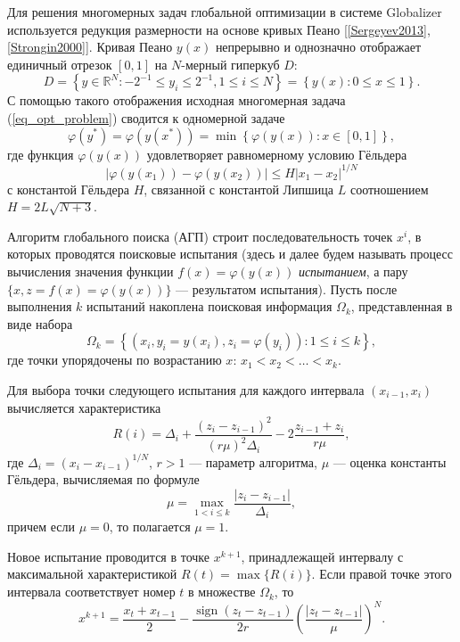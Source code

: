 \documentclass[10pt,a4paper]{book}
\begin{document}
Для решения многомерных задач глобальной оптимизации в системе Globalizer используется редукция размерности на основе кривых Пеано [\ref{Sergeyev2013}, \ref{Strongin2000}]. Кривая Пеано $y(x)$ непрерывно и однозначно отображает единичный отрезок $[0,1]$ на $N$-мерный гиперкуб $D$:
\[
D = \left\{ y \in \mathbb{R}^N: -2^{-1} \leqslant y_i \leqslant 2^{-1}, 1 \leqslant i \leqslant N \right\} = \left\{ y(x): 0 \leqslant x \leqslant 1 \right\}.
\]
С помощью такого отображения исходная многомерная задача (\ref{eq_opt_problem}) сводится к одномерной задаче
\[
\varphi(y^\ast)=\varphi(y(x^\ast))=\min{\left\{\varphi(y(x)): x\in[0,1]\right\}},
\]
где функция $\varphi(y(x))$ удовлетворяет равномерному условию Гёльдера
\[
\left|\varphi(y(x_1))-\varphi(y(x_2))\right|\leqslant H\left|x_1-x_2\right|^{1/N}
\]
с константой Гёльдера $H$, связанной с константой Липшица $L$ соотношением $H = 2L\sqrt{N+3}$.

Алгоритм глобального поиска (АГП) строит последовательность точек $x^i$, в которых проводятся поисковые испытания (здесь и далее будем называть процесс вычисления значения функции $f(x)=\varphi(y(x))$ \textit{испытанием}, а пару $\{x, z = f(x) = \varphi(y(x))\}$ --- результатом испытания). Пусть после выполнения $k$ испытаний накоплена поисковая информация $\Omega_k$, представленная в виде набора
\[
\Omega_k = \left\{ (x_i, y_i = y(x_i), z_i = \varphi(y_i)) : 1 \leqslant i \leqslant k \right\},
\]
где точки упорядочены по возрастанию $x$: $x_1 < x_2 < \ldots < x_k$.

Для выбора точки следующего испытания для каждого интервала $(x_{i-1}, x_i)$ вычисляется характеристика
\begin{equation}
R(i) = \Delta_i + \frac{(z_i - z_{i-1})^2}{(r\mu)^2\Delta_i} - 2\frac{z_{i-1} + z_i}{r\mu}, \label{eq_R}
\end{equation}
где $\Delta_i = (x_i - x_{i-1})^{1/N}$, $r>1$ --- параметр алгоритма, $\mu$ --- оценка константы Гёльдера, вычисляемая по формуле
\[
\mu = \max_{1 < i \leqslant k} \frac{|z_i - z_{i-1}|}{\Delta_i},
\]
причем если $\mu = 0$, то полагается $\mu = 1$.

Новое испытание проводится в точке $x^{k+1}$, принадлежащей интервалу с максимальной характеристикой $R(t) = \max\{R(i)\}$. Если правой точке этого интервала соответствует номер $t$ в множестве $\Omega_k$, то
\begin{equation}
x^{k+1} = \frac{x_t + x_{t-1}}{2} - \frac{\operatorname{sign}(z_t - z_{t-1})}{2r} \left( \frac{|z_t - z_{t-1}|}{\mu} \right)^N. \label{eq_x_new}
\end{equation}
\end{document}

